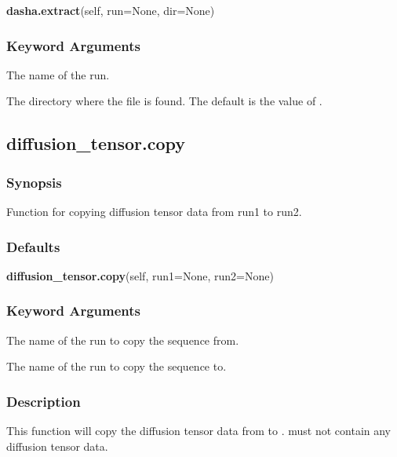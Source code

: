 \textsf{\textbf{dasha.extract}(self, run=None, dir=None)} 

  
 \subsubsection{Keyword Arguments} 

   The name of the run.   

   The directory where the file  is found.  The default is the value of .  

  

  

 \newpage 

 \subsection{diffusion\_tensor.copy} 

  
 \subsubsection{Synopsis} 

 Function for copying diffusion tensor data from run1 to run2. 
  

  
 \subsubsection{Defaults} 

 \textsf{\textbf{diffusion\_tensor.copy}(self, run1=None, run2=None)} 

  
 \subsubsection{Keyword Arguments} 

   The name of the run to copy the sequence from.   

   The name of the run to copy the sequence to.  

  

  
 \subsubsection{Description} 

 This function will copy the diffusion tensor data from  to .   must not contain any diffusion tensor data. 
  

